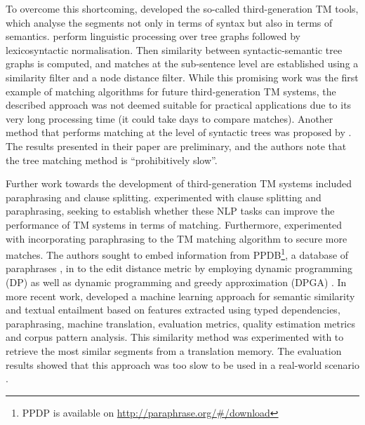 To overcome this shortcoming, \textcite{pekar2007new} developed the so-called third-generation TM tools, which analyse the segments not only in terms of syntax but also in terms of semantics. \textcite{pekar2007new} perform linguistic processing over tree graphs \autocite{szpektor-etal-2004-scaling,10.1007/978-3-540-30586-6_1} followed by lexicosyntactic normalisation. Then similarity between syntactic-semantic tree graphs is computed, and matches at the sub-sentence level are established using a similarity filter and a node distance filter. While this promising work was the first example of matching algorithms for future third-generation TM systems, the described approach was not deemed suitable for practical applications due to its very long processing time (it could take days to compare matches). Another method that performs matching at the level of syntactic trees was proposed by \textcite{vanallemeersch2014improving}. The results presented in their paper are preliminary, and the authors note that the tree matching method is ``prohibitively slow''.

Further work towards the development of third-generation TM systems included paraphrasing and clause splitting. \textcite{raisa-timonera-mitkov-2015-improving} experimented with clause splitting and paraphrasing, seeking to establish whether these NLP tasks can improve the performance of TM systems in terms of matching. Furthermore, \textcite{Gupta2016} experimented with incorporating paraphrasing to the TM matching algorithm to secure more matches. The authors sought to embed information from PPDB\footnote{PPDP is available on \url{http://paraphrase.org/\#/download}}, a database of paraphrases \autocite{ganitkevitch-etal-2013-ppdb}, in to the edit distance metric by employing dynamic programming (DP) \autocite{Gupta2016}  as well as dynamic programming and greedy approximation (DPGA) \autocite{10.1007/978-3-319-45510-5_30}. In more recent work, \textcite{gupta-etal-2014-uow} developed a machine learning approach for semantic similarity and textual entailment based on features extracted using typed dependencies, paraphrasing, machine translation, evaluation metrics, quality estimation metrics and corpus pattern analysis. This similarity method was experimented with to retrieve the most similar segments from a translation memory. The evaluation results showed that this approach was too slow to be used in a real-world scenario \autocite{gupta2014intelligent}. 

